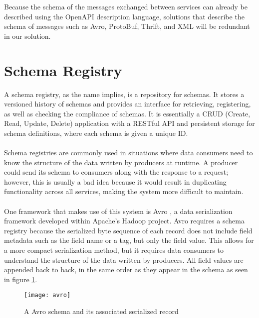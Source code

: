 Because the schema of the messages exchanged between services can already be described using the OpenAPI description language,
solutions that describe the schema of messages such as Avro, ProtoBuf, Thrift, and XML will be redundant in our solution.

\section{Schema Registry} %
\label{sec:schema_registry}

A schema registry, as the name implies, is a repository for schemas.
It stores a versioned history of schemas and provides an interface for retrieving, registering, as well as checking the compliance of schemas.
It is essentially a CRUD (Create, Read, Update, Delete) application with a RESTful API and persistent storage for schema definitions, where each schema is given a unique ID.

\paragraph{}

Schema registries are commonly used in situations where data consumers need to know the structure of the data written by producers at runtime.
A producer could send its schema to consumers along with the response to a request;
however, this is usually a bad idea because it would result in duplicating functionality across all services, making the system more difficult to maintain.

\paragraph{}

One framework that makes use of this system is Avro \cite{8}, a data serialization framework developed within Apache's Hadoop project.
Avro requires a schema registry because the serialized byte sequence of each record does not include field metadata such as the field name or a tag, but only the field value.
This allows for a more compact serialization method, but it requires data consumers to understand the structure of the data written by producers.
All field values are appended back to back, in the same order as they appear in the schema as seen in figure \ref{fig:avro}.

\begin{figure}[htbp]
    \centering
    \texttt{[image: avro]}
    \caption{A Avro schema and its associated serialized record }
    \label{fig:avro}
\end{figure}

